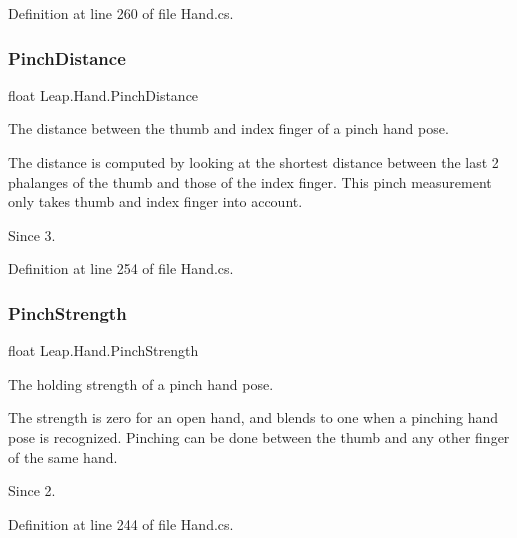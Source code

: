 Definition at line 260 of file Hand.\+cs.

\mbox{\label{class_leap_1_1_hand_aac8471ab94c8166143bd261b9ec0c9fb}} 
\subsubsection{\texorpdfstring{PinchDistance}{PinchDistance}}
{\footnotesize\ttfamily float Leap.\+Hand.\+Pinch\+Distance}



The distance between the thumb and index finger of a pinch hand pose. 

The distance is computed by looking at the shortest distance between the last 2 phalanges of the thumb and those of the index finger. This pinch measurement only takes thumb and index finger into account. \begin{DoxySince}{Since}
3. 
\end{DoxySince}


Definition at line 254 of file Hand.\+cs.

\mbox{\label{class_leap_1_1_hand_a1f615f0a7a58a53c3ff5db6d6b440d6a}} 
\subsubsection{\texorpdfstring{PinchStrength}{PinchStrength}}
{\footnotesize\ttfamily float Leap.\+Hand.\+Pinch\+Strength}



The holding strength of a pinch hand pose. 

The strength is zero for an open hand, and blends to one when a pinching hand pose is recognized. Pinching can be done between the thumb and any other finger of the same hand. \begin{DoxySince}{Since}
2. 
\end{DoxySince}


Definition at line 244 of file Hand.\+cs.

\mbox{\label{class_leap_1_1_hand_ad1f22c3baf75294e2aa4d834d87fec20}} 
